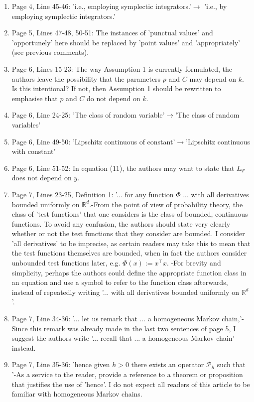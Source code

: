 \documentclass{article}
\begin{document}
\begin{enumerate}[label=(\arabic*)]
		\item Page 4, Line 45-46: 'i.e., employing symplectic integrators.'$\to$ 'i.e., by employing symplectic integrators.'
		\item Page 5, Lines 47-48, 50-51: The instances of 'punctual values' and 'opportunely' here should be replaced by 'point values' and 'appropriately' (see previous comments).
		\item Page 6, Lines 15-23: The way Assumption 1 is currently formulated, the authors leave the possibility that the parameters $p$ and $C$ may depend on $k$. Is this intentional? If not, then Assumption 1 should be rewritten to emphasise that $p$ and $C$ do not depend on $k$.
		\item Page 6, Line 24-25: 'The class of random variable'$\to$'The class of random variables'
		\item Page 6, Line 49-50: 'Lipschitz continuous of constant'$\to$'Lipschitz continuous with constant'
		\item Page 6, Line 51-52: In equation (11), the authors may want to state that $L_\Psi$ does not depend on $y$.
		\item Page 7, Lines 23-25, Definition 1: '... for any function $\Phi$ ... with all derivatives bounded uniformly on $\mathbb{R}^d$.-From the point of view of probability theory, the class of 'test functions' that one considers is the class of bounded, continuous functions. To avoid any confusion, the authors should state very clearly whether or not the test functions that they consider are bounded. I consider 'all derivatives' to be imprecise, as certain readers may take this to mean that the test functions themselves are bounded, when in fact the authors consider unbounded test functions later, e.g. $\Phi(x):=x^\top x$. -For brevity and simplicity, perhaps the authors could define the appropriate function class in an equation and use a symbol to refer to the function class afterwards, instead of repeatedly writing '... with all derivatives bounded uniformly on $\mathbb{R}^d$'.
		\item Page 7, Line 34-36: '... let us remark that ... a homogeneous Markov chain,'-Since this remark was already made in the last two sentences of page 5, I suggest the authors write '... recall that ... a homogeneous Markov chain' instead.
		\item Page 7, Line 35-36: 'hence given $h>0$ there exists an operator $\mathcal{P}_h$ such that '-As a service to the reader, provide a reference to a theorem or proposition that justifies the use of 'hence'. I do not expect all readers of this article to be familiar with homogeneous Markov chains.

\end{enumerate}
\end{document}
